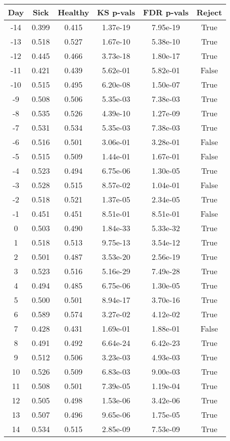 \begin{tabular}{c|c|c|c|c|c}
Day &  Sick & Healthy &  KS p-vals & FDR p-vals & Reject\\
\hline
-14 & 0.399 &   0.415 &   1.37e-19 &   7.95e-19 &   True\\
-13 & 0.518 &   0.527 &   1.67e-10 &   5.38e-10 &   True\\
-12 & 0.445 &   0.466 &   3.73e-18 &   1.80e-17 &   True\\
-11 & 0.421 &   0.439 &   5.62e-01 &   5.82e-01 &  False\\
-10 & 0.515 &   0.495 &   6.20e-08 &   1.50e-07 &   True\\
 -9 & 0.508 &   0.506 &   5.35e-03 &   7.38e-03 &   True\\
 -8 & 0.535 &   0.526 &   4.39e-10 &   1.27e-09 &   True\\
 -7 & 0.531 &   0.534 &   5.35e-03 &   7.38e-03 &   True\\
 -6 & 0.516 &   0.501 &   3.06e-01 &   3.28e-01 &  False\\
 -5 & 0.515 &   0.509 &   1.44e-01 &   1.67e-01 &  False\\
 -4 & 0.523 &   0.494 &   6.75e-06 &   1.30e-05 &   True\\
 -3 & 0.528 &   0.515 &   8.57e-02 &   1.04e-01 &  False\\
 -2 & 0.518 &   0.521 &   1.37e-05 &   2.34e-05 &   True\\
 -1 & 0.451 &   0.451 &   8.51e-01 &   8.51e-01 &  False\\
  0 & 0.503 &   0.490 &   1.84e-33 &   5.33e-32 &   True\\
  1 & 0.518 &   0.513 &   9.75e-13 &   3.54e-12 &   True\\
  2 & 0.501 &   0.487 &   3.53e-20 &   2.56e-19 &   True\\
  3 & 0.523 &   0.516 &   5.16e-29 &   7.49e-28 &   True\\
  4 & 0.494 &   0.485 &   6.75e-06 &   1.30e-05 &   True\\
  5 & 0.500 &   0.501 &   8.94e-17 &   3.70e-16 &   True\\
  6 & 0.589 &   0.574 &   3.27e-02 &   4.12e-02 &   True\\
  7 & 0.428 &   0.431 &   1.69e-01 &   1.88e-01 &  False\\
  8 & 0.491 &   0.492 &   6.64e-24 &   6.42e-23 &   True\\
  9 & 0.512 &   0.506 &   3.23e-03 &   4.93e-03 &   True\\
 10 & 0.526 &   0.509 &   6.83e-03 &   9.00e-03 &   True\\
 11 & 0.508 &   0.501 &   7.39e-05 &   1.19e-04 &   True\\
 12 & 0.505 &   0.498 &   1.53e-06 &   3.42e-06 &   True\\
 13 & 0.507 &   0.496 &   9.65e-06 &   1.75e-05 &   True\\
 14 & 0.534 &   0.515 &   2.85e-09 &   7.53e-09 &   True\\
\end{tabular}